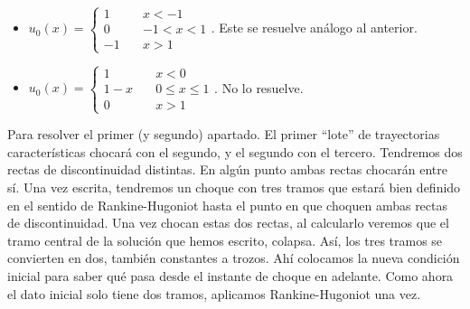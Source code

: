 \begin{ejercicio}
\begin{itemize}
\begin{figure}[H]
\begin{center}
\begin{tikzpicture}[x=0.75pt,y=0.75pt,yscale=-1,xscale=1]
                \end{tikzpicture}
            \end{center}
        \end{figure}
        Así pues: 
        $$u(2,x) = \begin{cases}
            2 \quad& x < 3 \\
            0 \quad& x > 3
        \end{cases} \stackrel{R.H}{\Longrightarrow} \lm = 1$$
        Si $x = a + \lm t$, evaluando en $(t,x) = (t^*, x^*) = (2,3)$ se tiene que $a = 1$
        y la solución quedaría 
        $$u(t,x) = \begin{cases}
            2 \quad& x < 1 + t \\
            0 \quad& x > 1 + t
        \end{cases}$$
        donde $(t,x) \in \left[2, +\infty \right[ \times \R$.
        \item $u_0(x) = \begin{cases}
            1 \quad& x < -1 \\
            0 \quad& -1 < x < 1 \\
            -1 \quad& x > 1
        \end{cases}$. Este se resuelve análogo al anterior.
        \item $u_0(x) = \begin{cases}
            1 \quad& x < 0 \\
            1-x \quad& 0 \leq x \leq 1 \\
            0 \quad& x > 1
        \end{cases}$. No lo resuelve.
    \end{itemize}
    Para resolver el primer (y segundo) apartado. El primer ``lote'' de trayectorias características chocará con el segundo, y el segundo con el tercero.
    Tendremos dos rectas de discontinuidad distintas. En algún punto ambas rectas chocarán entre sí. Una vez escrita, tendremos un choque con 
    tres tramos que estará bien definido en el sentido de Rankine-Hugoniot hasta el punto en que choquen ambas rectas de discontinuidad.
    Una vez chocan estas dos rectas, al calcularlo veremos que el tramo central de la solución que hemos escrito, colapsa. Así, los tres
    tramos se convierten en dos, también constantes a trozos. Ahí colocamos la nueva condición inicial para saber qué pasa desde el instante de choque
    en adelante. Como ahora el dato inicial solo tiene dos tramos, aplicamos Rankine-Hugoniot una vez. \\


\end{ejercicio}
